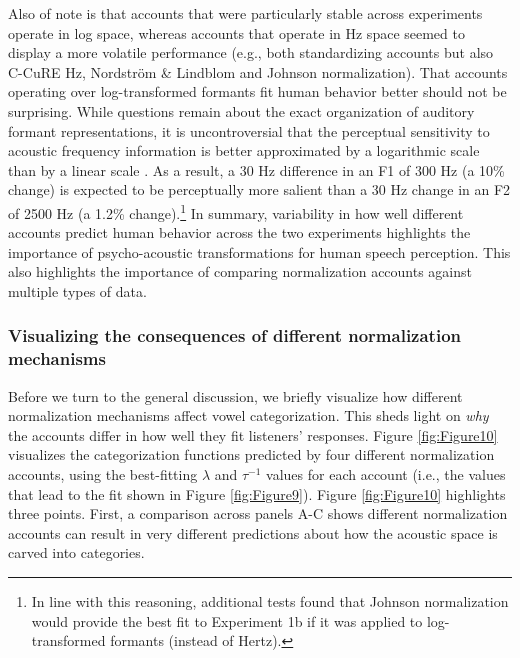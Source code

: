 \documentclass[preprint]{JASA}
\begin{document}
Also of note is that accounts that were particularly stable across experiments operate in log space, whereas accounts that operate in Hz space seemed to display a more volatile performance (e.g., both standardizing accounts but also C-CuRE Hz, Nordström \& Lindblom and Johnson normalization). That accounts operating over log-transformed formants fit human behavior better should not be surprising. While questions remain about the exact organization of auditory formant representations, it is uncontroversial that the perceptual sensitivity to acoustic frequency information is better approximated by a logarithmic scale than by a linear scale \citep[see][]{moore2012}. As a result, a 30 Hz difference in an F1 of 300 Hz (a 10\% change) is expected to be perceptually more salient than a 30 Hz change in an F2 of 2500 Hz (a 1.2\% change).\footnote{In line with this reasoning, additional tests found that Johnson normalization would provide the best fit to Experiment 1b if it was applied to log-transformed formants (instead of Hertz).} In summary, variability in how well different accounts predict human behavior across the two experiments highlights the importance of psycho-acoustic transformations for human speech perception. This also highlights the importance of comparing normalization accounts against multiple types of data.

\subsubsection{Visualizing the consequences of different normalization mechanisms}\label{sec:visualizing-consequences}

Before we turn to the general discussion, we briefly visualize how different normalization mechanisms affect vowel categorization. This sheds light on \emph{why} the accounts differ in how well they fit listeners' responses. Figure \ref{fig:Figure10} visualizes the categorization functions predicted by four different normalization accounts, using the best-fitting \(\lambda\) and \(\tau^{-1}\) values for each account (i.e., the values that lead to the fit shown in Figure \ref{fig:Figure9}). Figure \ref{fig:Figure10} highlights three points. First, a comparison across panels A-C shows different normalization accounts can result in very different predictions about how the acoustic space is carved into categories.
\end{document}
